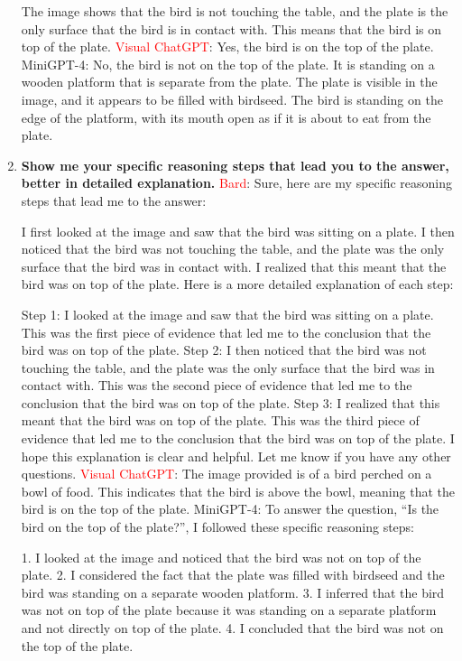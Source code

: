 \begin{enumerate}
        The image shows that the bird is not touching the table, and the plate is the only surface that the bird is in contact with. This means that the bird is on top of the plate.
        \subitem \textcolor{red}{Visual ChatGPT}: Yes, the bird is on the top of the plate.
        \subitem MiniGPT-4: No, the bird is not on the top of the plate. It is standing on a wooden platform that is separate from the plate. The plate is visible in the image, and it appears to be filled with birdseed. The bird is standing on the edge of the platform, with its mouth open as if it is about to eat from the plate.
        \item \textbf{Show me your specific reasoning steps that lead you to the answer, better in detailed explanation.}
        \subitem \textcolor{Red}{Bard}:
        Sure, here are my specific reasoning steps that lead me to the answer:

        I first looked at the image and saw that the bird was sitting on a plate.
        I then noticed that the bird was not touching the table, and the plate was the only surface that the bird was in contact with.
        I realized that this meant that the bird was on top of the plate.
        Here is a more detailed explanation of each step:

        Step 1: I looked at the image and saw that the bird was sitting on a plate. This was the first piece of evidence that led me to the conclusion that the bird was on top of the plate.
        Step 2: I then noticed that the bird was not touching the table, and the plate was the only surface that the bird was in contact with. This was the second piece of evidence that led me to the conclusion that the bird was on top of the plate.
        Step 3: I realized that this meant that the bird was on top of the plate. This was the third piece of evidence that led me to the conclusion that the bird was on top of the plate.
        I hope this explanation is clear and helpful. Let me know if you have any other questions.
        \subitem \textcolor{red}{Visual ChatGPT}: The image provided is of a bird perched on a bowl of food. This indicates that the bird is above the bowl, meaning that the bird is on the top of the plate.
        \subitem MiniGPT-4: To answer the question, “Is the bird on the top of the plate?”, I followed these specific reasoning steps:

        1. I looked at the image and noticed that the bird was not on top of the plate.
        2. I considered the fact that the plate was filled with birdseed and the bird was standing on a separate wooden platform.
        3. I inferred that the bird was not on top of the plate because it was standing on a separate platform and not directly on top of the plate.
        4. I concluded that the bird was not on the top of the plate.
        

\end{enumerate}
